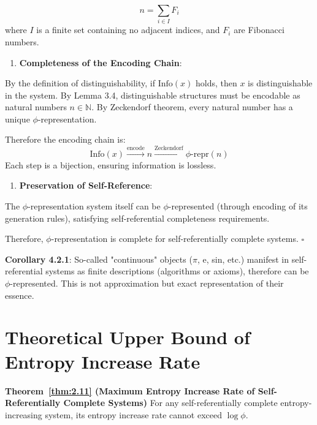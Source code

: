 \begin{equation}
n = \sum_{i \in I} F_i
\end{equation}
   where $I$ is a finite set containing no adjacent indices, and $F_i$ are Fibonacci numbers.

\begin{enumerate}
\item \textbf{Completeness of the Encoding Chain}:
\end{enumerate}
   By the definition of distinguishability, if $\text{Info}(x)$ holds, then $x$ is distinguishable in the system.
   By Lemma 3.4, distinguishable structures must be encodable as natural numbers $n \in \mathbb{N}$.
   By Zeckendorf theorem, every natural number has a unique $\phi$-representation.
   
   Therefore the encoding chain is:
\begin{equation}
\text{Info}(x) \xrightarrow{\text{encode}} n \xrightarrow{\text{Zeckendorf}} \phi\text{-repr}(n)
\end{equation}
   Each step is a bijection, ensuring information is lossless.

\begin{enumerate}
\item \textbf{Preservation of Self-Reference}:
\end{enumerate}
   The $\phi$-representation system itself can be $\phi$-represented (through encoding of its generation rules),
   satisfying self-referential completeness requirements.

Therefore, $\phi$-representation is complete for self-referentially complete systems. $\square$

\textbf{Corollary 4.2.1}:
\label{thm:2.9}
So-called "continuous" objects ($\pi$, e, sin, etc.) manifest in self-referential systems as finite descriptions (algorithms or axioms),
therefore can be $\phi$-represented. This is not approximation but exact representation of their essence.

\section{Theoretical Upper Bound of Entropy Increase Rate}
\label{sec:ch04_encoding:theoretical-upper-bound-of-entropy-increase-rate}

\textbf{Theorem~\ref{thm:2.11} (Maximum Entropy Increase Rate of Self-Referentially Complete Systems)}
\label{thm:2.11}
For any self-referentially complete entropy-increasing system, its entropy increase rate cannot exceed $\log \phi$.

